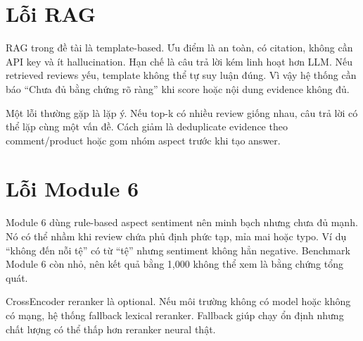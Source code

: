 \section{Lỗi RAG}
RAG trong đề tài là template-based. Ưu điểm là an toàn, có citation, không cần API key và ít hallucination. Hạn chế là câu trả lời kém linh hoạt hơn LLM. Nếu retrieved reviews yếu, template không thể tự suy luận đúng. Vì vậy hệ thống cần báo “Chưa đủ bằng chứng rõ ràng” khi score hoặc nội dung evidence không đủ.

Một lỗi thường gặp là lặp ý. Nếu top-k có nhiều review giống nhau, câu trả lời có thể lặp cùng một vấn đề. Cách giảm là deduplicate evidence theo comment/product hoặc gom nhóm aspect trước khi tạo answer.

\section{Lỗi Module 6}
Module 6 dùng rule-based aspect sentiment nên minh bạch nhưng chưa đủ mạnh. Nó có thể nhầm khi review chứa phủ định phức tạp, mỉa mai hoặc typo. Ví dụ “không đến nỗi tệ” có từ “tệ” nhưng sentiment không hẳn negative. Benchmark Module 6 còn nhỏ, nên kết quả  bằng 1,000 không thể xem là bằng chứng tổng quát.

CrossEncoder reranker là optional. Nếu môi trường không có model hoặc không có mạng, hệ thống fallback lexical reranker. Fallback giúp chạy ổn định nhưng chất lượng có thể thấp hơn reranker neural thật.


